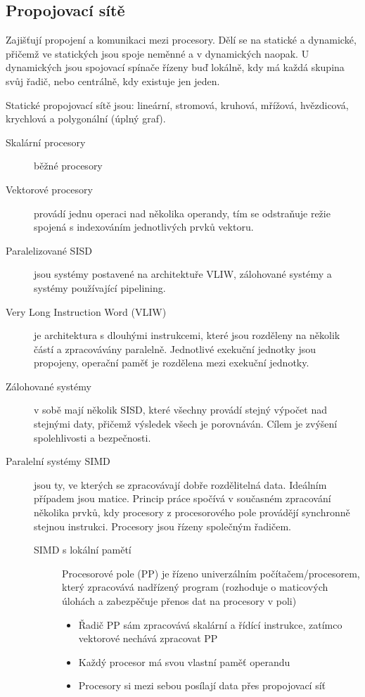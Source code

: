 \documentclass[10pt,a4paper,openright]{article}
\begin{document}
\subsection{Propojovací sítě}
Zajišťují propojení a komunikaci mezi procesory. Dělí se na statické a dynamické, přičemž ve statických jsou spoje neměnné a v dynamických naopak. U dynamických jsou spojovací spínače řízeny buď lokálně, kdy má každá skupina svůj řadič, nebo centrálně, kdy existuje jen jeden.

Statické propojovací sítě jsou: lineární, stromová, kruhová, mřížová, hvězdicová, krychlová a polygonální (úplný graf).

\begin{description}
\item[Skalární procesory] běžné procesory
\item[Vektorové procesory] provádí jednu operaci nad několika operandy, tím se odstraňuje režie spojená s indexováním jednotlivých prvků vektoru.
\item[Paralelizované SISD] jsou systémy postavené na architektuře VLIW, zálohované systémy a systémy používající pipelining.
\item[Very Long Instruction Word (VLIW)] je architektura s dlouhými instrukcemi, které jsou rozděleny na několik částí a zpracovávány paralelně. Jednotlivé exekuční jednotky jsou propojeny, operační paměť je rozdělena mezi exekuční jednotky.
\item[Zálohované systémy] v sobě mají několik SISD, které všechny provádí stejný výpočet nad stejnými daty, přičemž výsledek všech je porovnáván. Cílem je zvýšení spolehlivosti a bezpečnosti.
\item[Paralelní systémy SIMD] jsou ty, ve kterých se zpracovávají dobře rozdělitelná data. Ideálním případem jsou matice. Princip práce spočívá v současném zpracování několika prvků, kdy procesory z procesorového pole provádějí synchronně stejnou instrukci. Procesory jsou řízeny společným řadičem.
\begin{description}
\item [SIMD s lokální pamětí] Procesorové pole (PP) je řízeno univerzálním počítačem/procesorem, který zpracovává nadřízený program (rozhoduje o maticových úlohách a zabezpěčuje přenos dat na procesory v poli)
	\begin{itemize}
	\item Řadič PP sám zpracovává skalární a řídící instrukce, zatímco vektorové nechává zpracovat PP
	\item Každý procesor má svou vlastní paměť operandu
	\item Procesory si mezi sebou posílají data přes propojovací síť
	\end{itemize}
	

\end{description}
\end{description}
\end{document}
